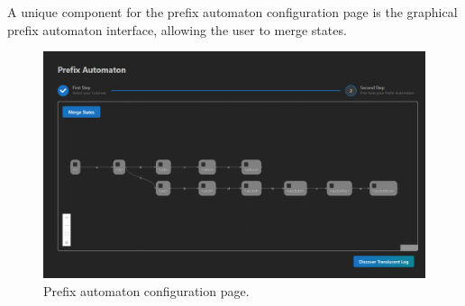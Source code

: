 A unique component for the prefix automaton configuration page is the graphical prefix automaton interface, allowing the user to merge states.



\begin{figure}[H]
    \centering
    \includegraphics[width=\textwidth]{figures/screenshots/paconfig.png}
    \caption{Prefix automaton configuration page.}
    \label{fig:pa-config}
\end{figure}

